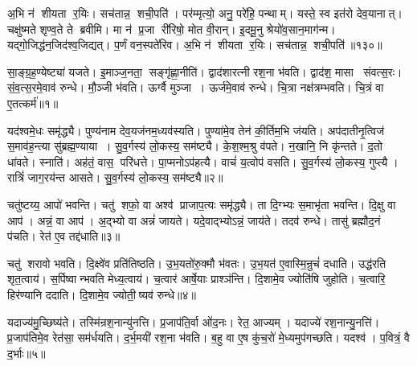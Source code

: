अ॒भि न॑ शीयता र॒यिः।
सच॑तान्न॒ शची॒पति॑।
पर॑म्मृत्यो॒ अनु॒ परे॑हि॒ पन्थाम्।
यस्ते॒ स्व इत॑रो देव॒यानात्।
चक्षु॑ष्मते शृण्व॒ते ते ब्रवीमि।
मा न॑ प्र॒जा री॑रिषो॒ मोत वी॒रान्।
इ॒दमू॒नु श्रेयो॑व॒सान॒माग॑न्म।
यद्गो॒जिद्ध॑न॒जिद॑श्व॒जिद्यत्।
प॒र्णं वन॒स्पते॑रिव।
अ॒भि न॑ शीयता र॒यिः।
सच॑तान्न॒ शची॒पति॑॥१३०॥\anuvakamend[वन॒स्पता॑व॒द्भ्यो लो॒का द॑धिरे॒ तेज॑ इन्द्रि॒यन्धामा॑शीमहीवा॒भिन॑ शीयता र॒यिरेकं च]




\clearpage
{}
\setcounter{anuvakam}{0}

सा॒ङ्ग्र॒ह॒ण्येष्ट्या॑ यजते।
इ॒माञ्ज॒नता॒ सङ्गृ॑ह्णा॒नीति॑।
द्वाद॑शारत्नी रश॒ना भ॑वति।
द्वाद॑श॒ मासा संवत्स॒रः।
सं॒व॒त्स॒रमे॒वाव॑ रुन्धे।
मौ॒ञ्जी भ॑वति।
ऊर्ग्वै मुञ्जा।
ऊर्ज॑मे॒वाव॑ रुन्धे।
चि॒त्रा नक्ष॑त्रम्भवति।
चि॒त्रं वा ए॒तत्कर्म॑॥१॥

यद॑श्वमे॒धः समृ॑द्ध्यै।
पुण्य॑नाम देव॒यज॑नम॒ध्यव॑स्यति।
पुण्या॑मे॒व तेन॑ की॒र्तिम॒भि ज॑यति।
अप॑दातीनृ॒त्विज॑ स॒माव॑ह॒न्त्या सु॑ब्रह्म॒ण्याया।
सु॒व॒र्गस्य॑ लो॒कस्य॒ सम॑ष्ट्यै।
के॒श॒श्म॒श्रु व॑पते।
न॒खानि॒ नि कृ॑न्तते।
द॒तो धा॑वते।
स्नाति॑।
अह॑तं॒ वास॒ परि॑धत्ते।
पा॒प्मनोऽप॑हत्यै।
वाचं॑ य॒त्वोप॑ वसति।
सु॒व॒र्गस्य॑ लो॒कस्य॒ गुप्त्यै।
रात्रिं॑ जाग॒रय॑न्त आसते।
सु॒व॒र्गस्य॑ लो॒कस्य॒ सम॑ष्ट्यै॥२॥\anuvakamend[कर्म॑ धत्ते॒ पञ्च॑ च]

चतु॑ष्टय्य॒ आपो॑ भवन्ति।
चतु॑ शफो॒ वा अश्व॑ प्राजाप॒त्यः समृ॑द्ध्यै।
ता दि॒ग्भ्यः स॒माभृ॑ता भवन्ति।
दि॒क्षु वा आप॑।
अन्नं॒ वा आप॑।
अ॒द्भ्यो वा अन्नं॑ जायते।
यदे॒वाद्भ्योऽन्नं॒ जाय॑ते।
तदव॑ रुन्धे।
तासु॑ ब्रह्मौद॒नं प॑चति।
रेत॑ ए॒व तद्द॑धाति॥३॥

चतु॑ शरावो भवति।
दि॒क्ष्वे॑व प्रति॑तिष्ठति।
उ॒भ॒यतो॑रु॒क्मौ भ॑वतः।
उ॒भ॒यत॑ ए॒वास्मि॒न्रुचं॑ दधाति।
उद्ध॑रति शृत॒त्वाय॑।
स॒र्पिष्वान्भवति मेध्य॒त्वाय॑।
च॒त्वार॑ आर्\mbox{}षे॒याः प्राश्ञ॑न्ति।
दि॒शामे॒व ज्योति॑षि जुहोति।
च॒त्वारि॒ हिर॑ण्यानि ददाति।
दि॒शामे॒व ज्योती॒ष्यव॑ रुन्धे॥४॥

यदाज्य॑मु॒च्छिष्य॑ते।
तस्मि॑न्रश॒नान्यु॑नत्ति।
प्र॒जाप॑ति॒र्वा ओ॑द॒नः।
रेत॒ आज्यम्।
यदाज्ये॑ रश॒नान्यु॒नत्ति॑।
प्र॒जाप॑तिमे॒व रेत॑सा॒ सम॑र्धयति।
द॒र्भ॒मयी॑ रश॒ना भ॑वति।
ब॒हु वा ए॒ष कु॑च॒रो॑ मे॒ध्यमुप॑गच्छति।
यदश्व॑।
प॒वित्रं॒ वै द॒र्भाः॥५॥

